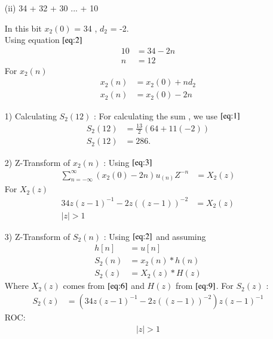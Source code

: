 \documentclass[journal,12pt,twocolumn]{IEEEtran}
\theoremstyle{remark}
\begin{document}
\begin{enumerate}
\vspace{0.5cm}
\item[(ii)]
 34 + 32 + 30 ... + 10
\vspace{0.2cm}

In this bit  $x_2(0)$ = 34 , $d_2$ = -2.\\

Using equation $\eqref{eq:2}$
\begin{align}
     10 &= 34 -2n\\
     n &= 12 
     \end{align}
For $x_2(n)$
\begin{align}
x_2(n) &= x_2(0) + nd_2\\
x_2(n) &= x_2(0) -2n
\end{align}


\item[1)] 
Calculating $S_2(12)$ :
For calculating the sum , we use $\eqref{eq:1}$
\begin{align}
 S_2{(12)} &= \frac{13}{2}(64+11(-2))\\
 S_2{(12)} &= 286.
 \end{align}

    \vspace{0.7cm}
\item[2)] 
Z-Transform of $x_2(n)$ :
Using $\eqref{eq:3}$
\vspace{0.05cm}
\begin{align}
\sum_{n=-\infty}^{\infty}(x_2(0) -2n)u_{(n)}Z^{-n} &= X_2(z)
\end{align}
For $X_2(z)$ 
\begin{align}
  34z(z-1)^{-1}-
       2z((z-1))^{-2} &= X_2(z) \label{eq:6}\\
    \lvert z\rvert  >  1 
\end{align}

\item[3)]
Z-Transform of $S_2(n)$ :
Using $\eqref{eq:2}$ and assuming 
\begin{align}
         h[n] &= u[n] \\
    S_2(n) &= x_2(n) * h(n) \\
    S_2(z) &= X_2(z) * H(z)
    \end{align}
    Where $X_2(z)$ comes from $\eqref{eq:6}$ and $H(z)$ from $\eqref{eq:9}$.
    \vspace{0.05cm}
    For $S_2(z)$ :
    \begin{align}
            S_2(z) &= (34z(z-1)^{-1}-
       2z((z-1))^{-2})z(z-1)^{-1}
    \end{align}
    ROC:
    \begin{align} 
    \lvert z \rvert > 1
    \end{align}
    

\end{enumerate}
\end{document}
